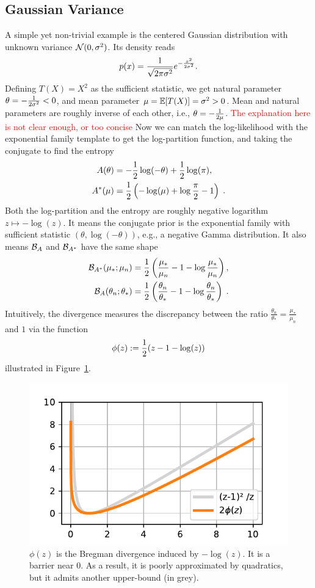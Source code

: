 \documentclass[twoside]{article}
\newcommand{\logpart}{A}
\newcommand{\conj}{\logpart^*}
\newcommand{\bregman}{\cB_\logpart}
\newcommand{\bregmanconj}{\cB_{\logpart^*}}
\newcommand{\nat}{\theta}
\newcommand{\m}{\mu}
\begin{document}
\subsection{Gaussian Variance}\label{ssec:gaussian-variance}

A simple yet non-trivial example is the centered Gaussian distribution with unknown variance ${\mathcal N}(0,\sigma^2)$.
Its density reads
\[
	p(x) = \frac{1}{\sqrt{2\pi \sigma^2}} e^{-\frac{x^2}{2 \sigma^2}}.
\]
Defining $T(X)=X^2$ as the sufficient statistic, we get natural parameter $\nat = -\inv{2 \sigma^2} <0$, and mean parameter $\m=\E[T(X)] = \sigma^2 >0$.
Mean and natural parameters are roughly inverse of each other, i.e., $\nat = -\inv{2 \m}$.
\textcolor{red}{The explanation here is not clear enough, or too concise} Now we can match the log-likelihood with the exponential family template to get the log-partition function, and taking the conjugate to find the entropy
\begin{align}
	\logpart (\nat) &= - \half \log(-\nat)  + \half \log(\pi), \\
	\conj(\m) &= \half\left( -\log(\m) + \log\frac{\pi}{2} - 1 \right) \; .
\end{align}
Both the log-partition and  the entropy are roughly negative logarithm $z\mapsto - \log(z)$.
It means the conjugate prior is the exponential family with sufficient statistic $(\nat, \log(-\nat) )$, e.g., a negative Gamma distribution.
It also means $\bregman$ and $\bregmanconj$ have the same shape
\begin{align}
	\bregmanconj( \m_*; \m_n)
	&= \half \left ( \frac{\m_*}{ \m_n} - 1 - \log  \frac{\m_*}{ \m_n} \right), \\
	\bregman( \nat_n; \nat_* )
	&=  \half \left ( \frac{ \nat_n}{\nat_*} - 1 - \log  \frac{ \nat_n}{\nat_*} \right) \; .
\end{align}
Intuitively, the divergence measures the discrepancy between the ratio $\frac{ \nat_n}{\nat_*} =  \frac{\m_*}{ \m_n}  $ and $1$ via the function
\begin{align}
	\phi(z) := \frac{1}{2} (z - 1 - \log(z))
\end{align}
illustrated in Figure~\ref{fig:phi}.


\begin{figure}[ht]
	\centering
	\includegraphics[width=.4\textwidth]{phi.pdf}
	\caption{$\phi(z)$ is the Bregman divergence induced by $-\log(z)$. It is a barrier near $0$. As a result, it is poorly approximated by quadratics, but it admits another upper-bound (in grey).}
	\label{fig:phi}
\end{figure}
\end{document}
